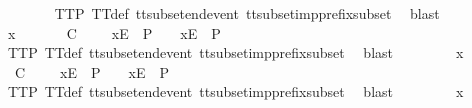 \begin{isabellebody}
\ \ \ \ \ \ \isamarkupfalse%
\ TT{}{\isacharunderscore}P\ TT{}{\isacharunderscore}def\ tt{\isacharunderscore}subset{\isacharunderscore}end{\isacharunderscore}event\ tt{\isacharunderscore}subset{\isacharunderscore}imp{\isacharunderscore}prefix{\isacharunderscore}subset\ \isamarkupfalse%
\ blast\isanewline
\ \ \isamarkupfalse%
\isanewline
\ \ \ \ \isamarkupfalse%
\ x\isanewline
\ \ \ \ \isamarkupfalse%
\ {\isachardoublequoteopen}{\isasymrho}{\isacharprime}\ {\isasymsubseteq}\isactrlsub C\ {\isasymrho}{\isacharprime}{\isacharprime}\ {\isasymLongrightarrow}\ {\isasymrho}{\isacharprime}{\isacharprime}\ {\isacharat}\ {\isacharbrackleft}{\isacharbrackleft}x{\isacharbrackright}\isactrlsub E{\isacharbrackright}\ {\isasymin}\ P\ {\isasymLongrightarrow}\ {\isasymrho}{\isacharprime}\ {\isacharat}\ {\isacharbrackleft}{\isacharbrackleft}x{\isacharbrackright}\isactrlsub E{\isacharbrackright}\ {\isasymin}\ P{\isachardoublequoteclose}\isanewline
\ \ \ \ \ \ \isamarkupfalse%
\ TT{}{\isacharunderscore}P\ TT{}{\isacharunderscore}def\ tt{\isacharunderscore}subset{\isacharunderscore}end{\isacharunderscore}event\ tt{\isacharunderscore}subset{\isacharunderscore}imp{\isacharunderscore}prefix{\isacharunderscore}subset\ \isamarkupfalse%
\ blast\isanewline
\ \ \isamarkupfalse%
\isanewline
\ \ \ \ \isamarkupfalse%
\ x\isanewline
\ \ \ \ \isamarkupfalse%
\ {\isachardoublequoteopen}{\isasymrho}{\isacharprime}\ {\isasymsubseteq}\isactrlsub C\ {\isasymrho}{\isacharprime}{\isacharprime}\ {\isasymLongrightarrow}\ {\isasymrho}{\isacharprime}{\isacharprime}\ {\isacharat}\ {\isacharbrackleft}{\isacharbrackleft}x{\isacharbrackright}\isactrlsub E{\isacharbrackright}\ {\isasymin}\ P\ {\isasymLongrightarrow}\ {\isasymrho}{\isacharprime}\ {\isacharat}\ {\isacharbrackleft}{\isacharbrackleft}x{\isacharbrackright}\isactrlsub E{\isacharbrackright}\ {\isasymin}\ P{\isachardoublequoteclose}\isanewline
\ \ \ \ \ \ \isamarkupfalse%
\ TT{}{\isacharunderscore}P\ TT{}{\isacharunderscore}def\ tt{\isacharunderscore}subset{\isacharunderscore}end{\isacharunderscore}event\ tt{\isacharunderscore}subset{\isacharunderscore}imp{\isacharunderscore}prefix{\isacharunderscore}subset\ \isamarkupfalse%
\ blast\isanewline
\ \ \isamarkupfalse%
\isanewline
\ \ \ \ \isamarkupfalse%
\ x\isanewline
\ \ \ \ \isamarkupfalse%

\end{isabellebody}
